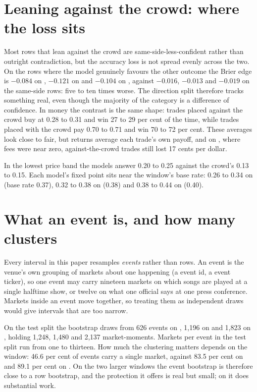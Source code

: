\section{Leaning against the crowd: where the loss sits}
\label{app:againstdetail}
Most rows that lean against the crowd are same-side-less-confident rather than
outright contradiction, but the accuracy loss is not spread evenly across the
two. On the rows where the model genuinely favours the other outcome the Brier
edge is $-0.084$ on \winA, $-0.121$ on \winB and $-0.104$ on \winC, against
$-0.016$, $-0.013$ and $-0.019$ on the same-side rows: five to ten times worse.
The direction split therefore tracks something real, even though the majority of
the category is a difference of confidence. In money the contrast is the same
shape: trades placed against the crowd buy at 0.28 to 0.31 and win 27 to 29 per
cent of the time, while trades placed with the crowd pay 0.70 to 0.71 and win 70
to 72 per cent. These averages look close to fair, but returns average each
trade's own payoff, and on \winA, where fees were near zero, against-the-crowd
trades still lost 17 cents per dollar.

In the lowest price band the models answer 0.20 to 0.25 against the crowd's 0.13
to 0.15. Each model's fixed point sits near the window's base rate: 0.26 to 0.34
on \winA (base rate 0.37), 0.32 to 0.38 on \winB (0.38) and 0.38 to 0.44 on
\winC (0.40).

\section{What an event is, and how many clusters}
\label{app:events}
Every interval in this paper resamples \emph{events} rather than rows. An event
is the venue's own grouping of markets about one happening (a \polymarket event
id, a \kalshi event ticker), so one event may carry nineteen markets on which
songs are played at a single halftime show, or twelve on what one official says
at one press conference. Markets inside an event move together, so treating them
as independent draws would give intervals that are too narrow.

On the test split the bootstrap draws from 626 events on \winA, 1{,}196 on \winB
and 1{,}823 on \winC, holding 1{,}248, 1{,}480 and 2{,}137 market-moments. Markets
per event in the test split run from one to thirteen. How much the clustering
matters depends on the window: 46.6 per cent of \winA events carry a single market,
against 83.5 per cent on \winB and 89.1 per cent on \winC. On the two larger
windows the event bootstrap is therefore close to a row bootstrap, and the
protection it offers is real but small; on \winA it does substantial work.

